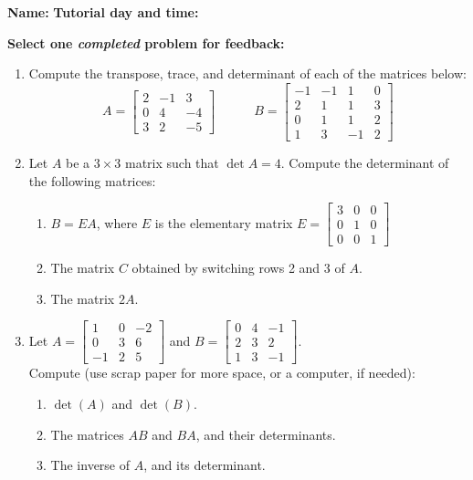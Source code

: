 \documentclass[12pt]{article}
\newcommand{\bbm}{\begin{bmatrix}}
\newcommand{\ebm}{\end{bmatrix}}
\begin{document}
{\bf \large Name:} \hspace{2.5in} {\bf Tutorial day and time:}

\bigskip

{\bf Select {\bf one} {\em completed} problem for feedback:}

\bigskip


\thispagestyle{fancy}
 \begin{enumerate}
\item Compute the transpose, trace, and determinant of each of the matrices below:
\[
 A = \bbm 2 & -1 & 3\\0&4&-4\\3&2&-5\ebm \quad \quad \quad B = \bbm -1&-1&1&0\\2&1&1&3\\0&1&1&2\\1&3&-1&2\ebm
\]

\newpage

\item Let $A$ be a $3\times 3$ matrix such that $\det A = 4$. Compute the determinant of the following matrices:
\begin{enumerate}
 \item $B=EA$, where $E$ is the elementary matrix $E=\bbm 3&0&0\\0&1&0\\0&0&1\ebm$

\vspace{0.75in}

 \item The matrix $C$ obtained by switching rows 2 and 3 of $A$.

\vspace{0.75in}

 \item The matrix $2A$.

\vspace{0.75in}
\end{enumerate}

\item Let $A = \bbm 1&0&-2\\0&3&6\\-1&2&5\ebm$ and $B = \bbm 0&4&-1\\2&3&2\\1&3&-1\ebm$.\\Compute (use scrap paper for more space, or a computer, if needed):
\begin{enumerate}
 \item $\det(A)$ and $\det(B)$.

\vspace{1.25in}

 \item The matrices $AB$ and $BA$, and their determinants.

\vspace{1.25in}

 \item The inverse of $A$, and its determinant.
\end{enumerate}


 \end{enumerate}
\end{document}
